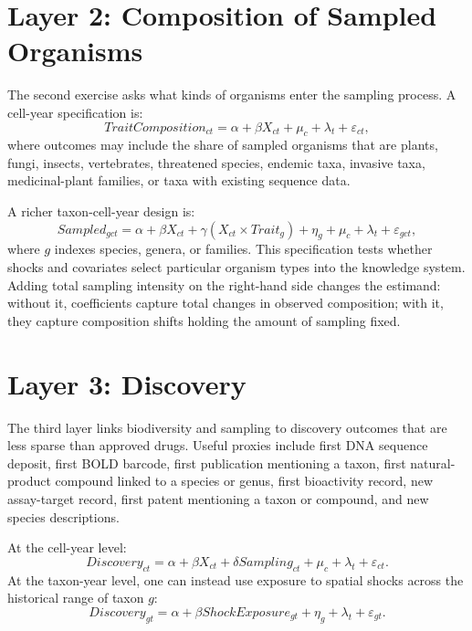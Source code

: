 \documentclass[10pt]{article}
\begin{document}
\section*{Layer 2: Composition of Sampled Organisms}

The second exercise asks what kinds of organisms enter the sampling process. A cell-year specification is:
\begin{equation}
    TraitComposition_{ct} = \alpha + \beta X_{ct} + \mu_c + \lambda_t + \varepsilon_{ct},
\end{equation}
where outcomes may include the share of sampled organisms that are plants, fungi, insects, vertebrates, threatened species, endemic taxa, invasive taxa, medicinal-plant families, or taxa with existing sequence data.

A richer taxon-cell-year design is:
\begin{equation}
    Sampled_{gct} = \alpha + \beta X_{ct} + \gamma (X_{ct} \times Trait_g)
    + \eta_g + \mu_c + \lambda_t + \varepsilon_{gct},
\end{equation}
where $g$ indexes species, genera, or families. This specification tests whether shocks and covariates select particular organism types into the knowledge system. Adding total sampling intensity on the right-hand side changes the estimand: without it, coefficients capture total changes in observed composition; with it, they capture composition shifts holding the amount of sampling fixed.

\section*{Layer 3: Discovery}

The third layer links biodiversity and sampling to discovery outcomes that are less sparse than approved drugs. Useful proxies include first DNA sequence deposit, first BOLD barcode, first publication mentioning a taxon, first natural-product compound linked to a species or genus, first bioactivity record, new assay-target record, first patent mentioning a taxon or compound, and new species descriptions.

At the cell-year level:
\begin{equation}
    Discovery_{ct} = \alpha + \beta X_{ct} + \delta Sampling_{ct}
    + \mu_c + \lambda_t + \varepsilon_{ct}.
\end{equation}
At the taxon-year level, one can instead use exposure to spatial shocks across the historical range of taxon $g$:
\begin{equation}
    Discovery_{gt} = \alpha + \beta ShockExposure_{gt}
    + \eta_g + \lambda_t + \varepsilon_{gt}.
\end{equation}
\end{document}
